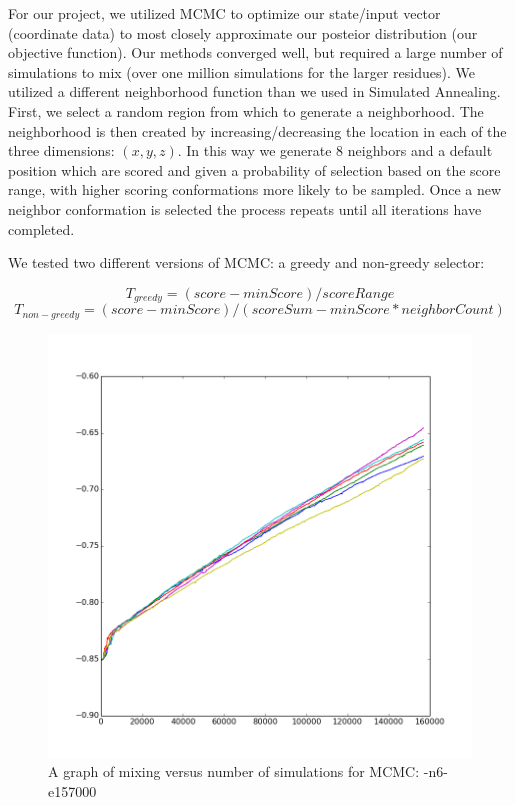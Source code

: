 \documentclass{article}
\begin{document}
For our project, we utilized MCMC to optimize our state/input vector (coordinate data) to most closely approximate our posteior distribution (our objective function).  Our methods converged well, but required a large number of simulations to mix (over one million simulations for the larger residues).  We utilized a different neighborhood function than we used in Simulated Annealing.  First, we select a random region from which to generate a neighborhood. The neighborhood is then created by increasing/decreasing the location in each of the three dimensions: $(x, y, z)$. In this way we generate 8 neighbors and a default position which are scored and given a probability of selection based on the score range, with higher scoring conformations more likely to be sampled. Once a new neighbor conformation is selected the process repeats until all iterations have completed.

We tested two different versions of MCMC: a greedy and non-greedy selector:

\begin{equation}
      T_{greedy} = (score - minScore) / scoreRange
    \end{equation}
\begin{equation}
      T_{non-greedy} = (score - minScore) / (scoreSum - minScore * neighborCount)
    \end{equation}

\begin{figure}[H]
\begin{center}
\includegraphics[width=\textwidth]{MCMC_Chromo7-Scores}
\caption{A graph of mixing versus number of simulations for MCMC: -n6-e157000}
\label{Fig:mcmc_mixing}
\end{center}
\end{figure}
\end{document}
